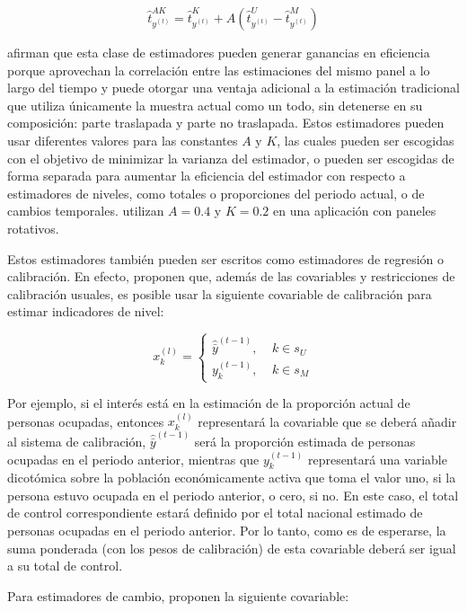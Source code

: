 \documentclass[
  12pt,
]{book}
\begin{document}
\[
\hat{t}_{y^{(t)}}^{AK} = \hat{t}_{y^{(t)}}^K + A  (\hat{t}_{y^{(t)}}^U - \hat{t}_{y^{(t)}}^M)
\]

\citet{Steel_McLaren_2008} afirman que esta clase de estimadores pueden generar ganancias en eficiencia porque aprovechan la correlación entre las estimaciones del mismo panel a lo largo del tiempo y puede otorgar una ventaja adicional a la estimación tradicional que utiliza únicamente la muestra actual como un todo, sin detenerse en su composición: parte traslapada y parte no traslapada. Estos estimadores pueden usar diferentes valores para las constantes \(A\) y \(K\), las cuales pueden ser escogidas con el objetivo de minimizar la varianza del estimador, o pueden ser escogidas de forma separada para aumentar la eficiencia del estimador con respecto a estimadores de niveles, como totales o proporciones del periodo actual, o de cambios temporales. \citet{Gurney_Daly_1965} utilizan \(A=0.4\) y \(K=0.2\) en una aplicación con paneles rotativos.

Estos estimadores también pueden ser escritos como estimadores de regresión o calibración. En efecto, \citet{Gambino_Kennedy_Singh_2001} proponen que, además de las covariables y restricciones de calibración usuales, es posible usar la siguiente covariable de calibración para estimar indicadores de nivel:

\[
x_k^{(l)} = 
\begin{cases}
\hat {\bar y} ^{(t-1)}, \ \ \ \ \ k \in s_U \\
y_{k}^{(t-1)}, \ \ \ \ \ k \in s_M 
\end{cases}
\]

Por ejemplo, si el interés está en la estimación de la proporción actual de personas ocupadas, entonces \(x_k^{(l)}\) representará la covariable que se deberá añadir al sistema de calibración, \(\hat {\bar y} ^{(t-1)}\) será la proporción estimada de personas ocupadas en el periodo anterior, mientras que \(y_{k}^{(t-1)}\) representará una variable dicotómica sobre la población económicamente activa que toma el valor uno, si la persona estuvo ocupada en el periodo anterior, o cero, si no. En este caso, el total de control correspondiente estará definido por el total nacional estimado de personas ocupadas en el periodo anterior. Por lo tanto, como es de esperarse, la suma ponderada (con los pesos de calibración) de esta covariable deberá ser igual a su total de control.

Para estimadores de cambio, \citet{Gambino_Kennedy_Singh_2001} proponen la siguiente covariable:
\end{document}
